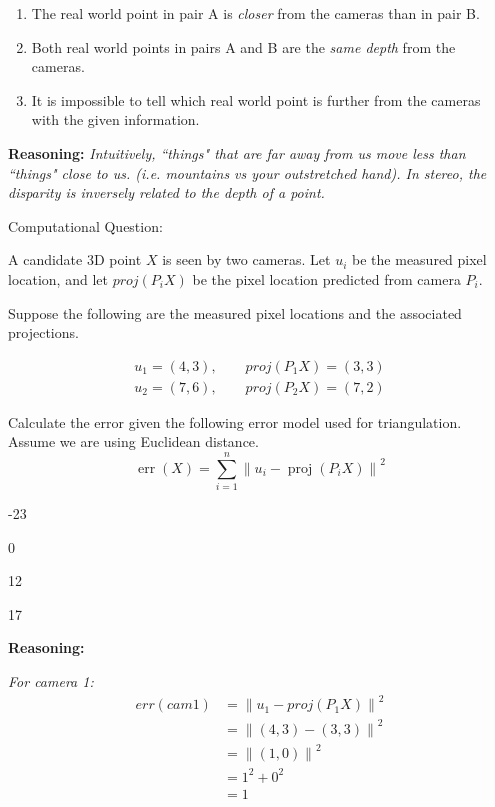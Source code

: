 \documentclass[11pt]{article}
\begin{document}
\begin{enumerate}
\begin{enumerate}
			\item The real world point in pair A is {\it closer} from the cameras than in pair B.

			\item Both real world points in pairs A and B are the {\it same depth} from the cameras.

			\item It is impossible to tell which real world point is further from the cameras with the given information.

		\end{enumerate}

		{\bf Reasoning:} {\it Intuitively, ``things" that are far away from us move less than ``things" close to us. (i.e. mountains vs your outstretched hand). In stereo, the disparity is inversely related to the depth of a point.}

	{\bf \item Computational Question:}
	
		A candidate 3D point $X$ is seen by two cameras. Let $u_i$ be the measured pixel location, and let $proj(P_iX)$ be the pixel location predicted from camera $P_i$.

		Suppose the following are the measured pixel locations and the associated projections.

		\begin{gather*}
			u_1=(4, 3), \qquad proj(P_1X)=(3, 3) \\
			u_2=(7, 6), \qquad proj(P_2X)=(7, 2)
		\end{gather*}

		Calculate the error given the following error model used for triangulation.
		Assume we are using Euclidean distance.
		\[
			\operatorname{err}(X)
			=
			\sum_{i=1}^{n}
			\left\|
			u_i - \operatorname{proj}(P_i X)
			\right\|^2
		\]

		\begin{enumerate}
			\item -23
			\item 0
			\item 12
			{\bf \item 17}
		\end{enumerate}

		{\bf Reasoning:} 

		{\it For camera 1:}
		\begin{align*}
			err(cam1) &= \left\| u_1 - proj(P_1X) \right\|^2 \\
			&= \left\| (4, 3) - (3, 3) \right\|^2 \\
			&= \left\| (1, 0) \right\|^2 \\
			&= 1^2 + 0^2 \\
			&= 1 
		\end{align*}


\end{enumerate}
\end{document}
